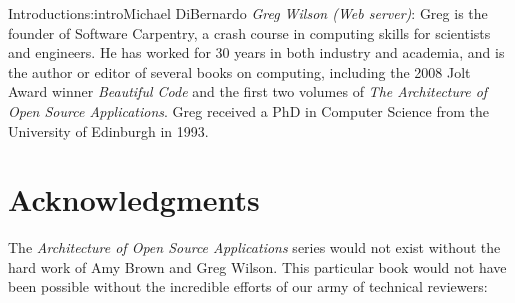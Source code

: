 \begin{aosachapter}{Introduction}{s:intro}{Michael DiBernardo}
\emph{Greg Wilson (Web server)}: Greg is the founder of Software Carpentry, a crash course in computing skills for scientists and engineers.  He has worked for 30 years in both industry and academia, and is the author or editor of several books on computing, including the 2008 Jolt Award winner \emph{Beautiful Code} and the first two volumes of \emph{The Architecture of Open Source Applications}. Greg received a PhD in Computer Science from the University of Edinburgh in 1993.

\newpage 

\section*{Acknowledgments}

The \emph{Architecture of Open Source Applications} series would not exist without the hard work of Amy Brown and Greg Wilson. This particular book would not have been possible without the incredible efforts of our army of technical reviewers:
 

\end{aosachapter}
